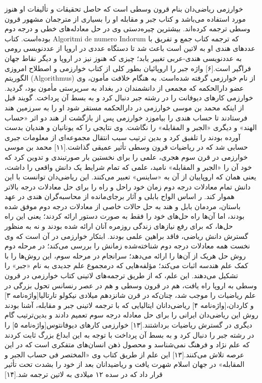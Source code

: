 خوارزمی ریاضی‌دان بنام قرون وسطی است که حاصل تحقیقات و تألیفات او هنوز مورد استفاده می‌باشد و کتاب جبر و مقابله او را بسیاری از مترجمان مشهور قرون وسطی ترجمه کرده‌اند. بیشترین چیره‌دستی وی در حل معادله‌های خطی و درجه دوم بوده‌است. کتاب Algoritmi de numero Indorum که ترجمه کتاب جمع و تفریق با عددهای هندی او به لاتین است باعث شد تا دستگاه عددی در اروپا از عددنویسی رومی به عددنویسی هندی-عربی تغییر یابد؛ چیزی که هنوز نیز در اروپا و دیگر نقاط جهان فراگیر است.[۶] واژه جبر را اروپائیان بطور کلی از کتاب خوارزمی و اصطلاح امروزی الگوریتم (Algorithmus) از نام خوارزمی گرفته شده‌است. به هنگام خلافت مأمون، وی عضو دارالحکمه که مجمعی از دانشمندان در بغداد به سرپرستی مأمون بود، گردید. خوارزمی کارهای دیوفانت را در رشته جبر دنبال کرد و به بسط آن پرداخت.
گویند قبل از اینکه محمد بن موسی خوارزمی در دارالحکمه مستقر شود او را به سرزمین هند فرستادند تا حساب هندی را بیاموزد خوارزمی پس از بازگشت از هند دو اثر «حساب الهند» و دیگری «الجبر و المقابله» را نگاشت. وی نتایجی را که یونانیان و هندیان بدست آورده بودند را تلفیق کرد و بدین ترتیب سبب انتقال مجموعه‌ای از معلومات جبری حسابی شد که در ریاضیات قرون وسطی تأثیر عمیقی گذاشت.[۱۱]
محمد بن موسی خوارزمی در قرن سوم هجری، علمی را برای نخستین بار صورتبندی و تدوین کرد که خود آن را «الجبر و المقابله» نامید، علمی که تمام شرایط یک دانش واقعی را داشت، یعنی همان که اروپاییان از آن به «ساینس» تعبیر می‌کنند. این ریاضی‌دان توانست با این دانش تمام معادلات درجه دوم زمان خود راحل و راه را برای حل معادلات درجه بالاتر هموار کند.
ر اساس الواح بابلی و آثار برجای‌مانده از محاسبه‌گران هندی در عهد باستان، مردمان بابل و هند به حل حالات خاصی از معادلات درجه دوم موفق شده بودند، اما آن‌ها راه حل‌های خود را فقط به صورت دستور ارائه کردند؛ یعنی این راه حل‌ها، که برای رفع نیازهای زندگی روزمره آنان ارائه شده بودند و نه به منظور گسترش دانش ریاضی، فاقد براهین علمی بودند. ابتکار خوارزمی در آن است که وی نخست همه معادلات درجه دوم شناخته‌شده زمانش را بررسی می‌کند؛ در مرحله دوم روش حل هریک از آن‌ها را ارائه می‌دهد؛ سرانجام در مرحله سوم، این روش‌ها را با کمک علم هندسه اثبات می‌کند؛ مؤلفه‌هایی که درمجموع علم جدیدی به نام «جبر» را تشکیل می‌دهند. این علم، که از طریق ترجمه‌های لاتینی کتاب خوارزمی در قرون وسطی به اروپا راه یافت، هم در قرون وسطی و هم در عصر رنسانس تحول بزرگی در علم ریاضیات را موجب شد، چنان‌که در قرن شانزدهم میلادی نیکولو تارتالیا[واژه‌نامه ۳] و کاردان،[واژه‌نامه ۴] ریاضی‌دانان ایتالیایی که با ترجمه لاتینی جبر و مقابله، آشنا بودند روش این ریاضی‌دان ایرانی را برای حل معادله درجه سوم تعمیم دادند و بدین‌ترتیب گام دیگری در گسترش ریاضیات برداشتند.[۱۳]
خوارزمی کارهای دیوفانتوس[واژه‌نامه ۵] را در رشته جبر را دنبال کرد و به بسط آن پرداخت با توجه به این ابداع بزرگ ثابت کردند که علم نژاد و فرهنگ نمی‌شناسد و محصول ذهن انسان‌های متفکری است که در این عرصه تلاش می‌کنند.[۱۳] این علم از طریق کتاب وی «المختصر فی حساب الجبر و المقابله» در جهان اسلام شهرت یافت و ریاضیدانان بعد از خود را بشدت تحت تأثیر قرار داد که در سده ۱۲ میلادی به لاتین ترجمه شد.[۱۴]